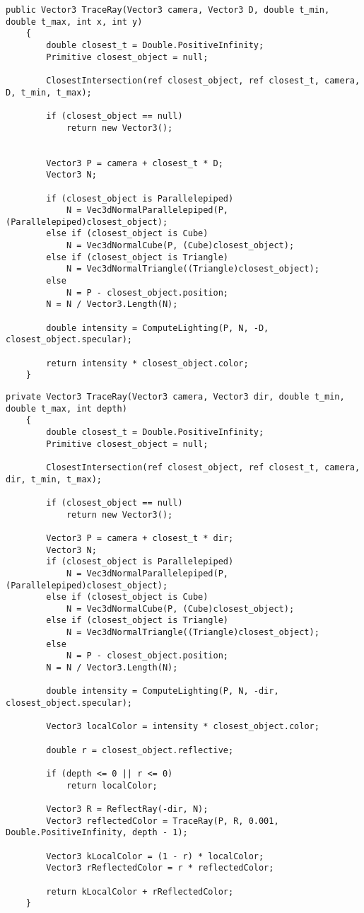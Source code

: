 \bigskip
\begin{lstlisting}[caption=Простой алгоритм обратной трассировки лучей]
	public Vector3 TraceRay(Vector3 camera, Vector3 D, double t_min, double t_max, int x, int y)
	{
		double closest_t = Double.PositiveInfinity;
		Primitive closest_object = null;
		
		ClosestIntersection(ref closest_object, ref closest_t, camera, D, t_min, t_max);
		
		if (closest_object == null)
			return new Vector3();
		
		
		Vector3 P = camera + closest_t * D; 
		Vector3 N;
		
		if (closest_object is Parallelepiped)
			N = Vec3dNormalParallelepiped(P, (Parallelepiped)closest_object);
		else if (closest_object is Cube)
			N = Vec3dNormalCube(P, (Cube)closest_object);
		else if (closest_object is Triangle)
			N = Vec3dNormalTriangle((Triangle)closest_object);
		else
			N = P - closest_object.position; 
		N = N / Vector3.Length(N);
		
		double intensity = ComputeLighting(P, N, -D, closest_object.specular);
		
		return intensity * closest_object.color;
	}
\end{lstlisting}
\clearpage

\begin{lstlisting}[caption=Модифицированный алгоритм обратной трассировки лучей]
	private Vector3 TraceRay(Vector3 camera, Vector3 dir, double t_min, double t_max, int depth)
	{
		double closest_t = Double.PositiveInfinity;
		Primitive closest_object = null;
		
		ClosestIntersection(ref closest_object, ref closest_t, camera, dir, t_min, t_max);
		
		if (closest_object == null)
			return new Vector3();
		
		Vector3 P = camera + closest_t * dir;
		Vector3 N;
		if (closest_object is Parallelepiped)
			N = Vec3dNormalParallelepiped(P, (Parallelepiped)closest_object);
		else if (closest_object is Cube)
			N = Vec3dNormalCube(P, (Cube)closest_object);
		else if (closest_object is Triangle)
			N = Vec3dNormalTriangle((Triangle)closest_object);
		else
			N = P - closest_object.position;
		N = N / Vector3.Length(N);
		
		double intensity = ComputeLighting(P, N, -dir, closest_object.specular);
		
		Vector3 localColor = intensity * closest_object.color;
		
		double r = closest_object.reflective;
		
		if (depth <= 0 || r <= 0)
			return localColor;
		
		Vector3 R = ReflectRay(-dir, N);
		Vector3 reflectedColor = TraceRay(P, R, 0.001, Double.PositiveInfinity, depth - 1);
		
		Vector3 kLocalColor = (1 - r) * localColor;
		Vector3 rReflectedColor = r * reflectedColor;
		
		return kLocalColor + rReflectedColor;
	}
\end{lstlisting}
\clearpage

